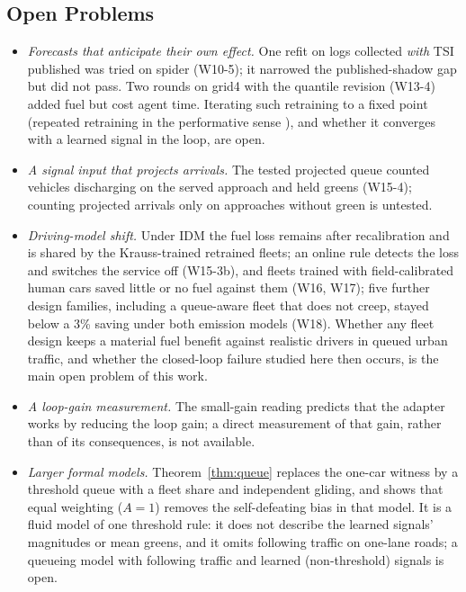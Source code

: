 \subsection{Open Problems}
\begin{itemize}\setlength\itemsep{1pt}
\item \emph{Forecasts that anticipate their own effect.} One refit on logs collected \emph{with} TSI published was tried on spider (W10-5); it
narrowed the published-shadow gap but did not pass. Two rounds on grid4 with the quantile revision (W13-4) added fuel but cost agent time. Iterating such retraining to a fixed point (repeated retraining in the performative
sense \cite{perdomo2020}), and whether it converges with a learned signal in the loop, are open.
\item \emph{A signal input that projects arrivals.} The tested projected queue counted vehicles discharging on the served approach and
held greens (W15-4); counting projected arrivals only on approaches without green is untested.
\item \emph{Driving-model shift.} Under IDM the fuel loss remains after recalibration and is shared by the Krauss-trained retrained fleets;
an online rule detects the loss and switches the service off (W15-3b), and fleets trained with field-calibrated human cars saved little or
no fuel against them (W16, W17); five further design families, including a queue-aware fleet that does not creep, stayed below a 3\%
saving under both emission models (W18). Whether any fleet design keeps a material fuel benefit against realistic drivers in queued urban
traffic, and whether the closed-loop failure studied here then occurs, is the main open problem of this work.
\item \emph{A loop-gain measurement.} The small-gain reading predicts that the adapter works by reducing the loop gain; a direct
measurement of that gain, rather than of its consequences, is not available.
\item \emph{Larger formal models.} Theorem~\ref{thm:queue} replaces the one-car witness by a threshold queue with a fleet share and
independent gliding, and shows that equal weighting ($A=1$) removes the self-defeating bias in that model. It is a fluid model of one threshold rule:
it does not describe the learned signals' magnitudes or mean greens, and it omits following traffic on one-lane roads; a queueing model
with following traffic and learned (non-threshold) signals is open.
\end{itemize}

